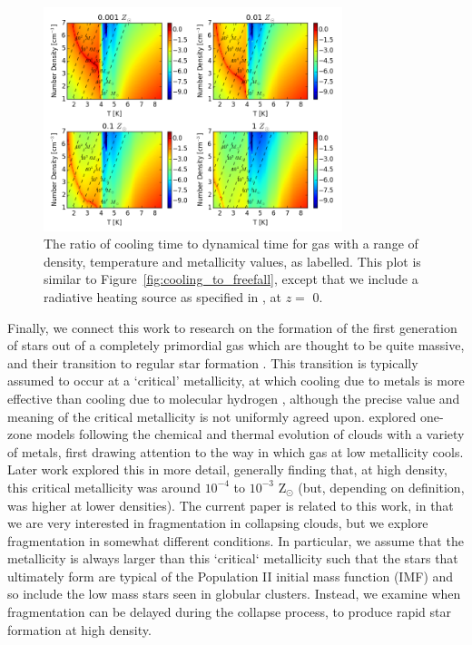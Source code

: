 \documentclass[useAMS,usenatbib]{mn2e}
\begin{document}
\begin{figure}
\begin{center}
\mbox{\includegraphics[width=8.7cm]{Images/cooling_to_freefall}}
\end{center}
\caption{\label{fig:cooling_to_freefall_background} The ratio of cooling time to dynamical time for gas with a range of density, temperature and metallicity values, as labelled.  This plot is similar to Figure~\ref{fig:cooling_to_freefall}, except that we include a radiative heating source as specified in \citet{Haardt2012}, at $z=$ 0.}
\end{figure}

Finally, we connect this work to research on the formation of the first generation of stars out of a completely primordial gas which are thought to be quite massive, and their transition to regular star formation \citep[for reviews see][]{Bromm2011, Glover2013}.  This transition is typically assumed to occur at a `critical' metallicity, at which cooling due to metals is more effective than cooling due to molecular hydrogen \citep{Bromm2001}, although the precise value and meaning of the critical metallicity is not uniformly agreed upon.  \citet{Omukai2000} explored one-zone models following the chemical and thermal evolution of clouds with a variety of metals, first drawing attention to the way in which gas at low metallicity cools.  Later work \citep{Bromm2003, Omukai2005, Santori2006} explored this in more detail, generally finding that, at high density, this critical metallicity was around $10^{-4}$ to $10^{-3}$ Z$_{\odot}$ (but, depending on definition, was higher at lower densities).  The current paper is related to this work, in that we are very interested in fragmentation in collapsing clouds, but we explore fragmentation in somewhat different conditions.  In particular, we assume that the metallicity is always larger than this `critical` metallicity such that the stars that ultimately form are typical of the Population II initial mass function (IMF) and so include the low mass stars seen in globular clusters.  Instead, we examine when fragmentation can be delayed during the collapse process, to produce rapid star formation at high density.
\end{document}
